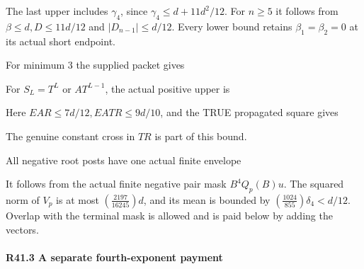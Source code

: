 The last upper includes \(\gamma_{4}\), since \(\gamma_{4}\le d+11d^2/12\). For \(n\ge 5\) it follows from \(\beta\le d,\allowbreak \allowbreak  D\le 11d/12\) and \(\lvert D_{n-1}\rvert \le d/12\). Every lower bound retains \(\beta_{1}=\beta_{2}=0\) at its actual short endpoint.

For minimum 3 the supplied packet gives



For \(S_L=T^L\) or \(A T^{L-1}\), the actual positive upper is


Here \(E AR\le 7d/12,\allowbreak \allowbreak  E ATR\le 9d/10\), and the TRUE propagated square gives


The genuine constant cross in \(TR\) is part of this bound.

All negative root posts have one actual finite envelope


It follows from the actual finite negative pair mask \(B^4 Q_p(B)u\). The squared norm of \(V_p\) is at most \((\frac{2197}{16245})d\), and its mean is bounded by \((\frac{1024}{855})\delta_4<d/12\). Overlap with the terminal mask is allowed and is paid below by adding the vectors.

\paragraph{R41.3 A separate fourth-exponent payment}

